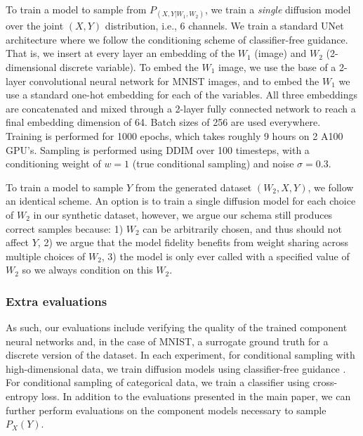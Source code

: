 \documentclass{article}
\theoremstyle{plain}
\theoremstyle{definition}
\theoremstyle{remark}
\begin{document}
	To train a model to sample from $P_(X,Y| W_1, W_2)$, we train a \emph{single} diffusion model over the joint $(X,Y)$ distribution, i.e., 6 channels. We train a standard UNet architecture where we follow the conditioning scheme of classifier-free guidance. That is, we insert at every layer an embedding of the $W_1$ (image) and $W_2$ (2-dimensional discrete variable). To embed the $W_1$ image, we use the base of a 2-layer convolutional neural network for MNIST images, and to embed the $W_1$ we use a standard one-hot embedding for each of the variables. All three embeddings are concatenated and mixed through a 2-layer fully connected network to reach a final embedding dimension of 64. Batch sizes of 256 are used everywhere. Training is performed for 1000 epochs, which takes roughly 9 hours on 2 A100 GPU's. Sampling is performed using DDIM over 100 timesteps, with a conditioning weight of $w=1$ (true conditional sampling) and noise $\sigma=0.3$. 
	
	To train a model to sample $Y$ from the generated dataset $(W_2, X,Y)$, we follow an identical scheme. An option is to train a single diffusion model for each choice of $W_2$ in our synthetic dataset, however, we argue our schema still produces correct samples because: 1) $W_2$ can be arbitrarily chosen, and thus should not affect $Y$, 2) we argue that the model fidelity benefits from weight sharing across multiple choices of $W_2$, 3) the model is only ever called with a specified value of $W_2$ so we always condition on this $W_2$.
	
	\subsubsection{Extra evaluations}
	
	As such, our evaluations include verifying the quality of the trained component neural networks and, in the case of MNIST, a surrogate ground truth for a discrete version of the dataset.
	In each experiment, for conditional sampling with high-dimensional data, we train diffusion models using classifier-free guidance \citep{ho2022classifier}. For conditional sampling of categorical data, we train a classifier using cross-entropy loss. 
	In addition to the evaluations presented in the main paper, we can further perform evaluations on the component models necessary to sample $P_X(Y)$. 
	
\end{document}
